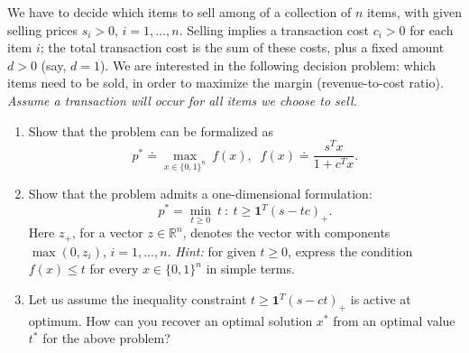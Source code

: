 \documentclass[11pt]{article}
\begin{document}
We have to decide which items to sell among of a collection of $n$ items, with given selling prices $s_i>0$, $i=1,\ldots,n$. Selling implies a transaction cost $c_i>0$ for each item $i$; the total transaction cost is the sum of these costs, plus a fixed amount $d>0$ (say, $d=1$). We are interested in the following decision problem: which items need to be sold, in order to maximize the margin (revenue-to-cost ratio). \textit{Assume a transaction will occur for all items we choose to sell.}

\begin{enumerate}
    \item Show that the problem can be formalized as
    \[
    p^* \doteq \max_{x \in \{0,1\}^n} \: f(x), \;\; f(x) \doteq \frac{s^T x}{1+c^T x} .
    \]

    \item Show that the problem admits a one-dimensional formulation:
    \[
    p^* = \min_{t \ge 0} \: t ~:~ t  \ge \mathbf{1}^T (s-tc)_+.
    \]
    Here $z_+$, for a vector $z \in \mathbb{R}^{n}$, denotes the vector with components $\max(0,z_i)$, $i=1,\ldots,n$. {\em Hint:} for given $t \ge 0$, express the condition $f(x) \le t$ for every $x \in \{0,1\}^n$ in simple terms.

    \item Let us assume the inequality constraint $t \ge \mathbf{1}^T (s-ct)_+$ is active at optimum. How can you recover an optimal solution $x^*$ from an optimal value $t^*$ for the above problem?
\end{enumerate}
\end{document}
